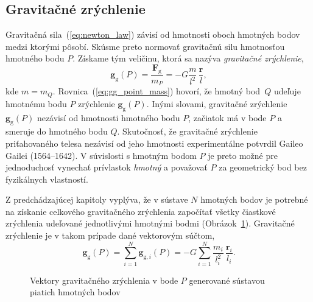 \documentclass[a4paper, 12pt]{book}
\newcommand{\gidx}{\mathrm g}
\let\vec\mathbf
\begin{document}
\subsection{Gravitačné zrýchlenie}
\label{sec:gg}

Gravitačná sila~(\ref{eq:newton_law}) závisí od hmotnosti oboch hmotných 
bodov medzi ktorými pôsobí.  Skúsme preto normovať gravitačnú silu hmotnosťou 
hmotného bodu $P$.  Získame tým veličinu, ktorá sa nazýva \emph{gravitačné 
zrýchlenie},
%
\begin{equation}
\label{eq:gg_point_mass}
\vec g_\gidx(P) = \frac{\vec F_\gidx}{m_P} = -G \frac{m}{l^2} \, \frac{\vec 
r}{l}{,}
\end{equation}
%
kde $m = m_Q$.  Rovnica~(\ref{eq:gg_point_mass}) hovorí, že hmotný 
bod~$Q$ udeľuje hmotnému bodu $P$ zrýchlenie $\vec g_\gidx(P)$.   Inými 
slovami, gravitačné zrýchlenie $\vec g_\gidx(P)$ nezávisí od hmotnosti hmotného 
bodu $P$, začiatok má v bode $P$ a smeruje do hmotného bodu $Q$.  Skutočnosť, 
že gravitačné zrýchlenie priťahovaného telesa nezávisí od jeho hmotnosti 
experimentálne potvrdil Gaileo Gailei (1564--1642).  V súvislosti s hmotným 
bodom $P$ je preto možné pre jednoduchosť vynechať prívlastok \emph{hmotný} 
a považovať $P$ za geometrický bod bez fyzikálnych vlastností.

Z predchádzajúcej kapitoly vyplýva, že v sústave $N$ hmotných bodov je potrebné 
na získanie celkového gravitačného zrýchlenia započítať všetky čiastkové 
zrýchlenia udeľované jednotlivými hmotnými bodmi 
(Obrázok~\ref{fig:gg_n_point_masses}).  Gravitačné zrýchlenie je v takom 
prípade dané vektorovým súčtom,
%
\begin{equation}
\label{eq:gg_N_point_masses}
\vec g_\gidx(P) = \sum_{i = 1}^{N}\vec g_{\gidx,i}(P) = -G \sum_{i = 1}^{N} 
\frac{m_i}{l_i^2} \, \frac{\vec r_i}{l_i}{.}
\end{equation}

\begin{figure}[b]
\centering

\caption{Vektory gravitačného zrýchlenia v bode $P$ generované sústavou piatich 
hmotných bodov}
\label{fig:gg_n_point_masses}
\end{figure}
\end{document}
